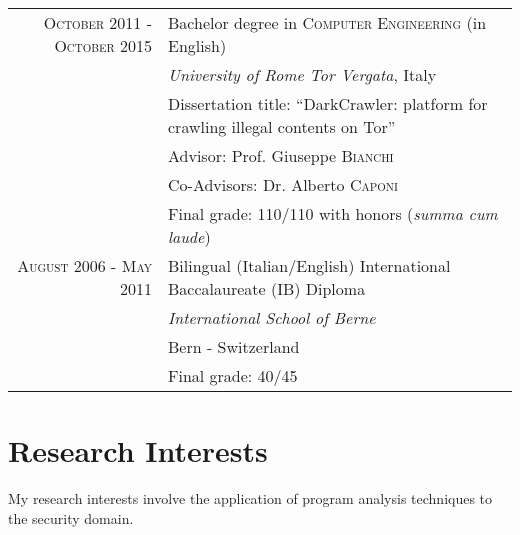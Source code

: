 \documentclass[a4paper,10pt]{article} %
\begin{document}
\begin{tabular}{rl}
\textsc{October} 2011 - \textsc{October} 2015 & Bachelor degree in \textsc{Computer Engineering} (in English)\\%
& \small\emph{University of Rome Tor Vergata}, Italy \\
& \small Dissertation title: “DarkCrawler: platform for crawling illegal contents on Tor” \\
& \small Advisor: Prof. Giuseppe \textsc{Bianchi} \\
& \small Co-Advisors: Dr. Alberto \textsc{Caponi} \\
& \small Final grade: 110/110 with honors (\emph{summa cum laude})
&\\

\textsc{August} 2006 - \textsc{May} 2011 & Bilingual (Italian/English) International Baccalaureate (IB) Diploma \\%
& \small\emph{International School of Berne} \\
& \small Bern - Switzerland \\
& \small Final grade: 40/45
&\\




\end{tabular}

\section{Research Interests}

My research interests involve the application of program analysis techniques to the security domain.
\end{document}
